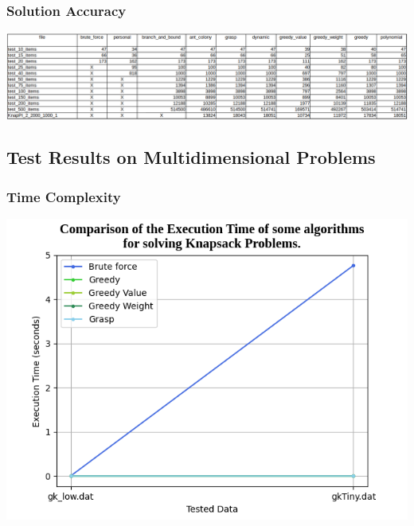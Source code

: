 \documentclass[a4paper, 11pt]{article}
\begin{document}
\begin{center}
        \subsubsection{Solution Accuracy}


            \includegraphics[scale = 0.45]{values_0-1.png}

    \subsection{Test Results on Multidimensional Problems}

    \subsubsection{Time Complexity}

    \includegraphics[scale = 0.5]{graph_multi_1.png}


\end{center}
\end{document}
